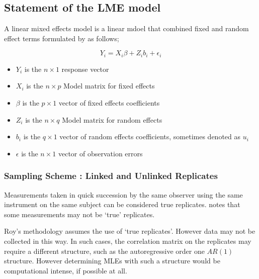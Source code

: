 \documentclass[12pt, a4paper]{article}
\theoremstyle{plain}
\theoremstyle{definition}
\theoremstyle{remark}
\begin{document}
	
	\subsection{Statement of the LME model}
	
	A linear mixed effects model is a linear mdoel that combined fixed and random effect terms formulated by \citet{LW82} as follows;
	
	\begin{displaymath}
	Y_{i} =X_{i}\beta + Z_{i}b_{i} + \epsilon_{i}
	\end{displaymath}
	\begin{itemize}
		
		\item $Y_{i}$ is the $n \times 1$ response vector \item $X_{i}$ is
		the $n \times p$ Model matrix for fixed effects \item $\beta$ is
		the $p \times 1$ vector of fixed effects coefficients \item
		$Z_{i}$ is the $n \times q$ Model matrix for random effects \item
		$b_{i}$ is the $q \times 1$ vector of random effects coefficients,
		sometimes denoted as $u_{i}$ \item $\epsilon$ is the $n \times 1$
		vector of observation errors
	\end{itemize}
	

	
	\newpage

	\subsubsection{Sampling Scheme : Linked and Unlinked Replicates}
	Measurements taken in quick succession by the same observer using the same instrument on the same subject can be considered true replicates. \citet{ARoy2009} notes that some measurements may not be `true' replicates.
	
	Roy's methodology assumes the use of `true replicates'. However data may not be collected in this way. In such cases, the correlation matrix on the replicates may require a different structure, such as the autoregressive order one $AR(1)$ structure. However determining MLEs with such a structure would be computational intense, if possible at all.
\end{document}

